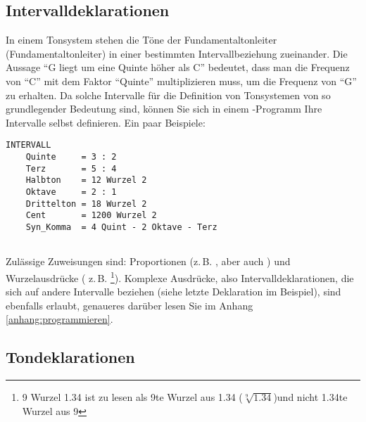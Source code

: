 \subsection{Intervalldeklarationen}\label{sec:interv}

In einem Tonsystem stehen die Töne der Fundamentaltonleiter (Fundamentaltonleiter)
in einer bestimmten Intervallbeziehung zueinander. Die Aussage "`G
liegt um eine Quinte höher als C"' bedeutet, dass man die Frequenz
von "`C"' mit dem Faktor "`Quinte"' multiplizieren muss, um die
Frequenz von "`G"' zu erhalten. Da solche Intervalle für die
Definition von Tonsystemen von so grundlegender Bedeutung sind,
können Sie sich in einem \mutabor{}-Programm Ihre
Intervalle selbst definieren. Ein paar Beispiele:
\begin{verbatim}
INTERVALL
    Quinte     = 3 : 2
    Terz       = 5 : 4
    Halbton    = 12 Wurzel 2
    Oktave     = 2 : 1
    Drittelton = 18 Wurzel 2
    Cent       = 1200 Wurzel 2
    Syn_Komma  = 4 Quint - 2 Oktave - Terz
  
\end{verbatim}
 Zulässige Zuweisungen sind: Proportionen
(z.\,B. , aber auch ) und Wurzelausdrücke (
z.\,B. \footnote{9 Wurzel 1.34 ist zu lesen als 9te
  Wurzel aus 1.34 ($\sqrt[9]{1.34}$)und nicht 1.34te Wurzel aus 9}).
Komplexe Ausdrücke, also Intervalldeklarationen, die sich auf andere
Intervalle beziehen (siehe letzte Deklaration im Beispiel), sind
ebenfalls erlaubt, genaueres darüber lesen Sie im Anhang
\ref{anhang:programmieren}.

\subsection{Tondeklarationen}\label{sec:tondeklarationen}

